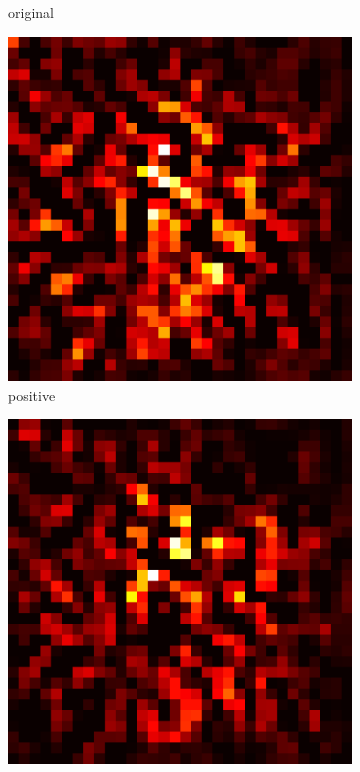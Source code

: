 \documentclass[preprint,12pt]{elsarticle}
\begin{document}
\begin{figure}
\begin{subfigure}{0.14\linewidth}
        \caption{original}
    \end{subfigure}
    \hfill
    \begin{subfigure}{0.14\textwidth}
        \centering
        \includegraphics[width=\linewidth]{../visualizations/examples/cifar10/resnet18/positive_saliency_map/9.png}
        \caption{positive}
    \end{subfigure}
    \hfill
    \begin{subfigure}{0.14\textwidth}
        \centering
        \includegraphics[width=\linewidth]{../visualizations/examples/cifar10/resnet18/negative_saliency_map/9.png}

\end{subfigure}
\end{figure}
\end{document}
